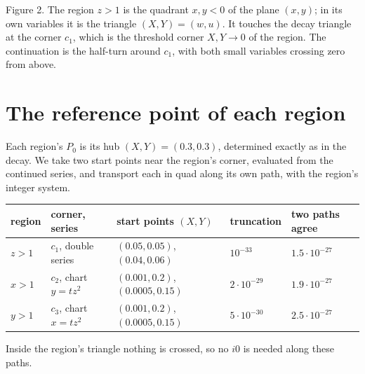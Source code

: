 \documentclass[11pt]{article}
\begin{document}
\begin{center}
\end{center}
\noindent Figure 2. The region $z>1$ is the quadrant $x,y<0$ of the plane $(x,y)$; in its own variables it is the
triangle $(X,Y)=(w,u)$. It touches the decay triangle at the corner $c_1$, which is the threshold corner $X,Y\to0$ of the
region. The continuation is the half-turn around $c_1$, with both small variables crossing zero from above.

\section{The reference point of each region}
Each region's $P_0$ is its hub $(X,Y)=(0.3,0.3)$, determined exactly as in the decay. We take two start points near the
region's corner, evaluated from the continued series, and transport each in quad along its own path, with the region's
integer system.
\begin{center}
\begin{tabular}{lllll}\toprule
region & corner, series & start points $(X,Y)$ & truncation & two paths agree \\ \midrule
$z>1$ & $c_1$, double series & $(0.05,0.05)$, $(0.04,0.06)$ & $10^{-33}$ & $1.5\cdot10^{-27}$ \\
$x>1$ & $c_2$, chart $y=tz^2$ & $(0.001,0.2)$, $(0.0005,0.15)$ & $2\cdot10^{-29}$ & $1.9\cdot10^{-27}$ \\
$y>1$ & $c_3$, chart $x=tz^2$ & $(0.001,0.2)$, $(0.0005,0.15)$ & $5\cdot10^{-30}$ & $2.5\cdot10^{-27}$ \\ \bottomrule
\end{tabular}
\end{center}
Inside the region's triangle nothing is crossed, so no $i0$ is needed along these paths.
\end{document}
